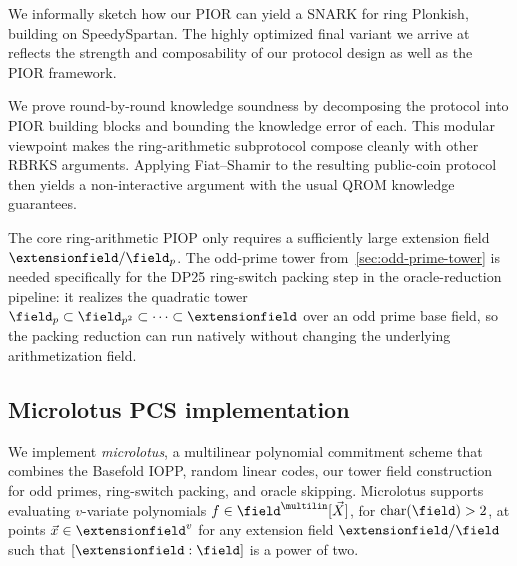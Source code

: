 \label{sec:tech-overview-speedyspartan}
We informally sketch how our PIOR can yield a SNARK for ring Plonkish, building on SpeedySpartan. The highly optimized final variant we arrive at reflects the strength and composability of our protocol design as well as the PIOR framework.

We prove round-by-round knowledge soundness by decomposing the protocol into PIOR building blocks and bounding the knowledge error of each. This modular viewpoint makes the ring-arithmetic subprotocol compose cleanly with other RBRKS arguments. Applying Fiat--Shamir to the resulting public-coin protocol then yields a non-interactive argument with the usual QROM knowledge guarantees.

The core ring-arithmetic PIOP only requires a sufficiently large extension field $\extensionfield/\field_p$. The odd-prime tower from~\cref{sec:odd-prime-tower} is needed specifically for the DP25 ring-switch packing step in the oracle-reduction pipeline: it realizes the quadratic tower $\field_p \subset \field_{p^2} \subset \cdots \subset \extensionfield$ over an odd prime base field, so the packing reduction can run natively without changing the underlying arithmetization field.

\subsection{Microlotus PCS implementation}
\label{sec:microlotus}

We implement \textit{microlotus}, a multilinear polynomial commitment scheme that combines the Basefold IOPP, random linear codes, our tower field construction for odd primes, ring-switch packing, and oracle skipping. Microlotus supports evaluating $v$-variate polynomials $f \in \field^{\multilin}[\vec{X}]$, for $\mathrm{char}(\field)>2$, at points $\vec{x} \in \extensionfield^v$ for any extension field $\extensionfield/\field$ such that $[\extensionfield:\field]$ is a power of two.

